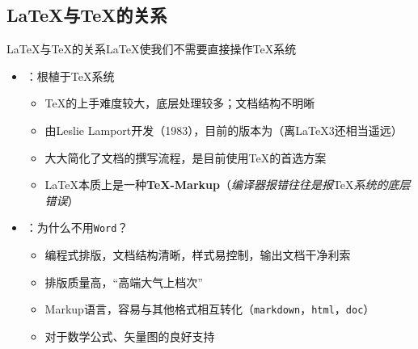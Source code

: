 \documentclass[10pt]{beamer}
\begin{document}
\subsection{\LaTeX 与\TeX 的关系}
\begin{frame}{\LaTeX 与\TeX 的关系}{\LaTeX 使我们不需要直接操作\TeX 系统}
\begin{itemize}
    \item {}：根植于\TeX 系统
    \begin{itemize}
        \item \TeX 的上手难度较大，底层处理较多；文档结构不明晰
        \item 由Leslie Lamport开发（1983），目前的版本为\LaTeXe（离\LaTeX3还相当遥远）
        \item 大大简化了文档的撰写流程，是目前使用\TeX 的首选方案
        \item \LaTeX 本质上是一种\textbf{\TeX-Markup}（\textit{编译器报错往往是报}\TeX\textit{系统的底层错误}）
    \end{itemize}
    \item {}：为什么不用\texttt{Word}？
    \begin{itemize}
        \item 编程式排版，文档结构清晰，样式易控制，输出文档干净利索
        \item 排版质量高，“高端大气上档次”
        \item Markup语言，容易与其他格式相互转化（\texttt{markdown}，\texttt{html}，\texttt{doc}）
        \item 对于数学公式、矢量图的良好支持
    \end{itemize}
\end{itemize}
\end{frame}
\end{document}
